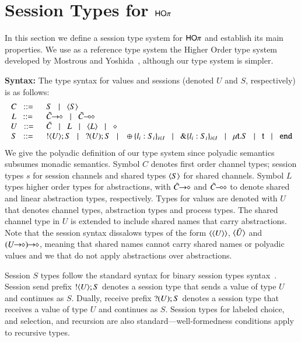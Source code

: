 
\section{Session Types for $\mathsf{HO}\pi$}
\label{s:types}

In this section we define a session type system for
$\mathsf{HO}\pi$ and establish its main properties. We use as
a reference type system the Higher Order type system
developed by Mostrous and Yoshida~\cite{tlca07}, although
our type system is simpler.

{\bf Syntax:}
The type syntax for values and sessions
(denoted $U$ and $S$, respectively) is as follows:
%
\[
\begin{array}{cl}
	C \bnfis &	S \bnfbar \chtype{S}\\ %
	L \bnfis &	\shot{\tilde{C}} \bnfbar \lhot{\tilde{C}} \\
	U \bnfis &	\tilde{C} \bnfbar L \bnfbar \chtype{L} \bnfbar \Proc\\
	S \bnfis & 	\btout{U} S \bnfbar \btinp{U} S
			\bnfbar \btsel{l_i:S_i}_{i \in I} \bnfbar \btbra{l_i:S_i}_{i \in I}
			\bnfbar \trec{t}{S} \bnfbar \vart{t}  \bnfbar \tinact
\end{array}
\]
%
\noi
We give the polyadic definition of our type system since
polyadic semantics subsumes monadic semantics.
Symbol $C$ denotes first order channel types; session types $s$
for session channels and shared types $\langle S \rangle$ for shared channels.
Symbol $L$ types higher order types for abstractions,
with $\tilde{C}\!\! \rightarrow\!\! \diamond$ and $\tilde{C}\!\! \multimap\!\! \diamond$ to denote
shared and linear abstraction types, respectively.
Types for values are denoted with $U$ that denotes
channel types, abstraction types and process types.
The shared channel type in $U$ is extended
to include shared names that carry abstractions.
Note that the session syntax dissalows types of
the form $\langle \langle U \rangle \rangle$, $\langle \tilde{U} \rangle$
and $\shot{(\shot{U})}$,
meaning that shared names cannot carry shared names or
polyadic values and
we that do not apply abstractions over abstractions.

Session $S$ types follow the standard syntax for
binary session types syntax~\cite{}.
Session send prefix $! \langle U \rangle ; S$ denotes a session type that
sends a value of type $U$ and continues as $S$.
Dually, receive prefix $? (U) ; S$ denotes a session type 
that receives a value of type $U$ and continues as $S$. 
Session types for labeled choice, and selection, and recursion
are also standard---well-formedness conditions apply to recursive types.

